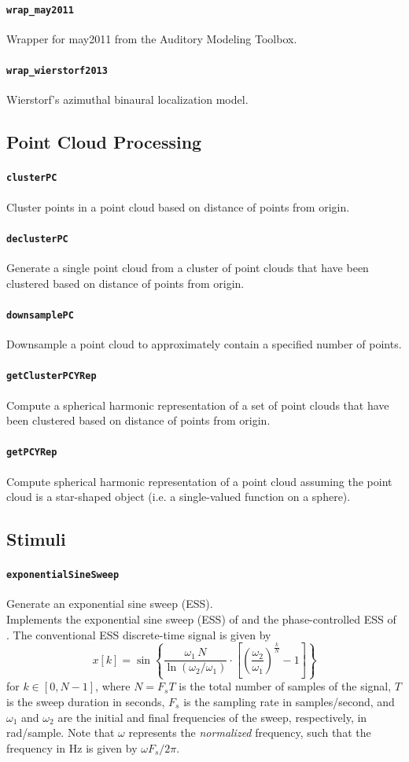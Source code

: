 \documentclass[11pt, oneside]{article}
\newcommand{\function}[1]{\paragraph*{\texttt{#1}}}
\begin{document}
\function{wrap\_may2011} Wrapper for may2011 from the Auditory Modeling Toolbox. \\

\function{wrap\_wierstorf2013} Wierstorf's azimuthal binaural localization model.

\subsection{Point Cloud Processing}

\function{clusterPC} Cluster points in a point cloud based on distance of points from origin. \\

\function{declusterPC} Generate a single point cloud from a cluster of point clouds that have been clustered based on distance of points from origin. \\

\function{downsamplePC} Downsample a point cloud to approximately contain a specified number of points. \\

\function{getClusterPCYRep} Compute a spherical harmonic representation of a set of point clouds that have been clustered based on distance of points from origin. \\

\function{getPCYRep} Compute spherical harmonic representation of a point cloud assuming the point cloud is a star-shaped object (i.e. a single-valued function on a sphere). \\

\subsection{Stimuli}

\function{exponentialSineSweep} Generate an exponential sine sweep (ESS). \\
Implements the exponential sine sweep (ESS) of \citet{Farina2000} and the phase-controlled ESS of \citet{VetterdiRosario2011}.
The conventional ESS discrete-time signal is given by~\cite{Farina2000}
\begin{equation}
x[k] = \sin \left\{ \frac{\omega_1\,N}{\ln\left(\omega_2/\omega_1\right)} \cdot \left[\left(\frac{\omega_2}{\omega_1}\right)^{\frac{k}{N}}-1\right] \right\}
\end{equation}
for $k \in[0,N-1]$, where $N = F_s T$ is the total number of samples of the signal, $T$ is the sweep duration in seconds, $F_s$ is the sampling rate in samples/second, and $\omega_1$ and $\omega_2$ are the initial and final frequencies of the sweep, respectively, in rad/sample. Note that $\omega$ represents the \textit{normalized} frequency, such that the frequency in Hz is given by $\omega F_s/2 \pi$.
\end{document}
